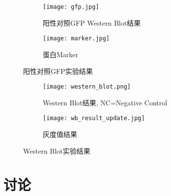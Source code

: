 \documentclass{article}
\begin{document}
\begin{figure}[htbp]
	\centering
	\begin{subfigure}[c]{0.77\textwidth}
		\texttt{[image: gfp.jpg]}
		\caption{阳性对照GFP Western Blot结果}
		\label{fig:sub3}
	\end{subfigure}
	\begin{subfigure}[c]{0.22\textwidth}
		\texttt{[image: marker.jpg]}
		\caption{蛋白Marker}
		\label{fig:sub4}
	\end{subfigure}
	\caption{阳性对照GFP实验结果}
	\label{fig:group2}
\end{figure}

\begin{figure}[t]
	\centering
	\begin{subfigure}[b]{0.65\textwidth}
		\texttt{[image: western\_blot.png]}
		\caption{Western Blot结果, NC=Negative Control}
		\label{fig:sub5}
	\end{subfigure}
	\begin{subfigure}[b]{0.34\textwidth}
		\texttt{[image: wb\_result\_update.jpg]}
		\caption{灰度值结果}
		\label{fig:sub6}
	\end{subfigure}
	\caption{Western Blot实验结果}
	\label{fig:group3}
\end{figure}

\restoregeometry


\section{讨论}
\end{document}
